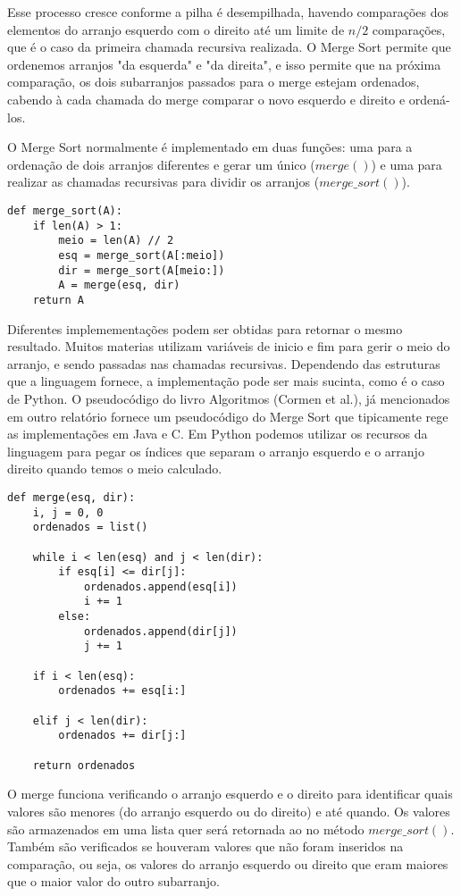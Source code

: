 \documentclass[a4paper, twocolumn]{article}
\theoremstyle{definition}
\begin{document}
Esse processo cresce conforme a pilha é desempilhada, havendo comparações dos elementos do arranjo esquerdo com o direito até um limite de $n/2$ comparações, que é o caso da primeira chamada recursiva realizada. O Merge Sort permite que ordenemos arranjos "da esquerda" e "da direita", e isso permite que na próxima comparação, os dois subarranjos passados para o merge estejam ordenados, cabendo à cada chamada do merge comparar o novo esquerdo e direito e ordená-los. 

O Merge Sort normalmente é implementado em duas funções: uma para a ordenação de dois arranjos diferentes e gerar um único ($merge()$) e uma para realizar as chamadas recursivas para dividir os arranjos ($merge\_sort()$).

\begin{lstlisting}[label=merge_sort,caption= Função merge sort]
def merge_sort(A):
    if len(A) > 1:
        meio = len(A) // 2
        esq = merge_sort(A[:meio])
        dir = merge_sort(A[meio:])
        A = merge(esq, dir)
    return A
\end{lstlisting}

Diferentes implemementações podem ser obtidas para retornar o mesmo resultado. Muitos materias utilizam variáveis de inicio e fim para gerir o meio do arranjo, e sendo passadas nas chamadas recursivas. Dependendo das estruturas que a linguagem fornece, a implementação pode ser mais sucinta, como é o caso de Python. O pseudocódigo do livro Algoritmos (Cormen et al.), já mencionados em outro relatório fornece um pseudocódigo do Merge Sort que tipicamente rege as implementações em Java e C. Em Python podemos utilizar os recursos da linguagem para pegar os índices que separam o arranjo esquerdo e o arranjo direito quando temos o meio calculado.

\begin{lstlisting}[label=merge,caption= Função merge]
def merge(esq, dir):
    i, j = 0, 0
    ordenados = list()

    while i < len(esq) and j < len(dir):
        if esq[i] <= dir[j]:
            ordenados.append(esq[i])
            i += 1
        else:
            ordenados.append(dir[j])
            j += 1
    
    if i < len(esq):
        ordenados += esq[i:]
    
    elif j < len(dir):
        ordenados += dir[j:]
    
    return ordenados
\end{lstlisting}

O merge funciona verificando o arranjo esquerdo e o direito para identificar quais valores são menores (do arranjo esquerdo ou do direito) e até quando. Os valores são armazenados em uma lista quer será retornada ao no método $merge\_sort()$. Também são verificados se houveram valores que não foram inseridos na comparação, ou seja, os valores do arranjo esquerdo ou direito que eram maiores que o maior valor do outro subarranjo.
    
\end{document}

